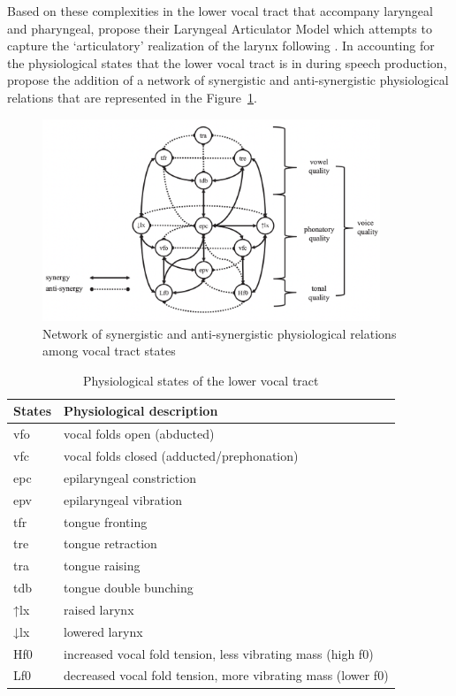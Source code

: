 \documentclass[12pt, letterpaper]{article}
\providecommand{\lsptoprule}{\midrule\toprule}
\providecommand{\lspbottomrule}{\bottomrule\midrule}
\begin{document}
Based on these complexities in the lower vocal tract that accompany laryngeal and pharyngeal, \citeauthor{eslingVoiceQualityLaryngeal2019} propose their Laryngeal Articulator Model which attempts to capture the `articulatory' realization of the larynx following \citet{ohalaPhoneticExplanationsSound2005,ohalaAccommodationAerodynamicVoicing2011}. In accounting for the physiological states that the lower vocal tract is in during speech production, \citeauthor{eslingVoiceQualityLaryngeal2019} propose the addition of a network of synergistic and anti-synergistic physiological relations that are represented in the Figure~\ref{fig:LAMNetwork}.

\begin{figure}[!ht]
\caption{Network of synergistic and anti-synergistic physiological relations among vocal tract states}
\label{fig:LAMNetwork}
\centering
\includegraphics[width=0.9\textwidth]{LAMNetwork.png}
\end{figure}

\begin{table}[!ht]
\centering
\caption{Physiological states of the lower vocal tract}
\label{tab:States}
 \begin{tabular}{ll}
  \lsptoprule
  States	&	 Physiological description \\
  \hline
  vfo   	&  vocal folds open (abducted) \\
	vfc    	&  vocal folds closed (adducted/prephonation)\\
	epc   	&  epilaryngeal constriction\\
	epv			&  epilaryngeal vibration \\
	tfr 		&  tongue fronting \\
	tre 		&  tongue retraction \\
	tra 		&  tongue raising \\
	tdb 		&	 tongue double bunching\\
	↑lx     &  raised larynx\\
	↓lx			&  lowered larynx\\
	Hf0			&  increased vocal fold tension, less vibrating mass (high f0)\\
	Lf0			&  decreased vocal fold tension, more vibrating mass (lower f0)\\
  \lspbottomrule
 \end{tabular}
\end{table}
\end{document}

